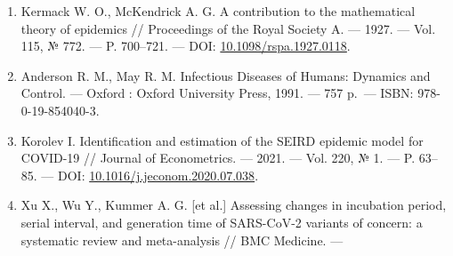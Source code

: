 \documentclass[12pt]{article}
\begin{document}
\begin{enumerate}
\def\labelenumi{\arabic{enumi}.}
\item
  Kermack W. O., McKendrick A. G. A contribution to the mathematical
  theory of epidemics // Proceedings of the Royal Society A. --- 1927.
  --- Vol. 115, № 772. --- P. 700--721. --- DOI:
  \href{https://doi.org/10.1098/rspa.1927.0118}{10.1098/rspa.1927.0118}.
\item
  Anderson R. M., May R. M. Infectious Diseases of Humans: Dynamics and
  Control. --- Oxford : Oxford University Press, 1991. --- 757 p.~---
  ISBN: 978-0-19-854040-3.
\item
  Korolev I. Identification and estimation of the SEIRD epidemic model
  for COVID-19 // Journal of Econometrics. --- 2021. --- Vol. 220, № 1.
  --- P. 63--85. --- DOI:
  \href{https://doi.org/10.1016/j.jeconom.2020.07.038}{10.1016/j.jeconom.2020.07.038}.
\item
  Xu X., Wu Y., Kummer A. G. {[}et al.{]} Assessing changes in
  incubation period, serial interval, and generation time of SARS-CoV-2
  variants of concern: a systematic review and meta-analysis // BMC
  Medicine. ---


\end{enumerate}
\end{document}

